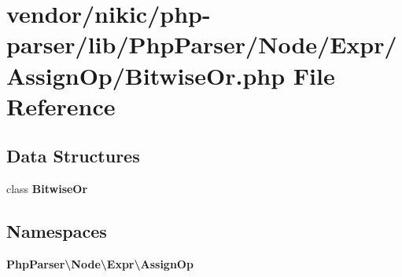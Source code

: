 \section{vendor/nikic/php-\/parser/lib/\+Php\+Parser/\+Node/\+Expr/\+Assign\+Op/\+Bitwise\+Or.php File Reference}
\label{_assign_op_2_bitwise_or_8php}
\subsection*{Data Structures}
\begin{DoxyCompactItemize}
\item 
class {\bf Bitwise\+Or}
\end{DoxyCompactItemize}
\subsection*{Namespaces}
\begin{DoxyCompactItemize}
\item 
 {\bf Php\+Parser\textbackslash{}\+Node\textbackslash{}\+Expr\textbackslash{}\+Assign\+Op}
\end{DoxyCompactItemize}
